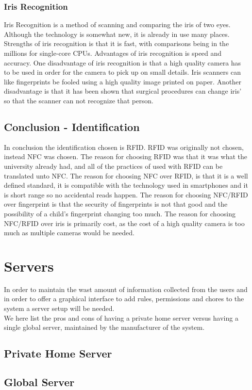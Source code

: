 \subsubsection{Iris Recognition}
Iris Recognition is a method of scanning and comparing the iris of two eyes. Although the technology is somewhat new, it is already in use many places. Strengths of iris recognition is that it is fast, with comparisons being in the millions for single-core CPUs. Advantages of iris recognition is speed and accuracy. One disadvantage of iris recognition is that a high quality camera has to be used in order for the camera to pick up on small details. Iris scanners can like fingerprints be fooled using a high quality image printed on paper. Another disadvantage is that it has been shown that surgical procedures can change iris' so that the scanner can not recognize that person.

\subsection{Conclusion - Identification}
In conclusion the identification chosen is RFID. RFID was originally not chosen, instead NFC was chosen. The reason for choosing RFID was that it was what the university already had, and all of the practices of used with RFID can be translated unto NFC. The reason for choosing NFC over RFID, is that it is a well defined standard, it is compatible with the technology used in smartphones and it is short range so no accidental reads happen. The reason for choosing NFC/RFID over fingerprint is that the security of fingerprints is not that good and the possibility of a child's fingerprint changing too much. The reason for choosing NFC/RFID over iris is primarily cost, as the cost of a high quality camera is too much as multiple cameras would be needed.

\section{Servers}
In order to maintain the wast amount of information collected from the users and in order to offer a graphical interface to add rules, permissions and chores to the system a server setup will be needed.\\
We here list the pros and cons of having a private home server versus having a single global server, maintained by the manufacturer of the system.

\subsection{Private Home Server}

\subsection{Global Server}
